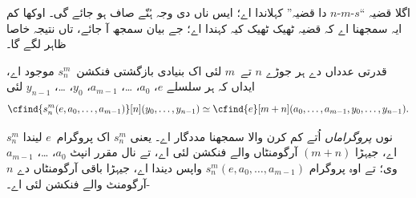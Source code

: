\documentclass[../../../include/open-logic-section]{subfiles}
\begin{document}

\begin{explain}
اگلا قضیہ ``$s$-$m$-$n$ دا قضیہ'' کہلاندا اے؛ ایس ناں دی
وجہ ہُنّے صاف ہو جائے گی۔ اوکھا کم ایہ سمجھنا اے کہ
قضیہ ٹھیک ٹھیک کیہ کہندا اے؛ جے بیان سمجھ آ جائے، تاں
نتیجہ خاصا ظاہر لگے گا۔
\end{explain}

\begin{thm}
  قدرتی عدداں دے ہر جوڑے $n$ تے~$m$ لئی اک بنیادی
  بازگشتی فنکشن~$s^m_n$ موجود اے، ایداں کہ ہر سلسلے
  $e$، $a_0$، \dots، $a_{m-1}$، $y_0$، \dots، $y_{n-1}$ لئی
  \[
  \cfind{s^m_n(e, a_0, \dots, a_{m-1})}[n](y_0, \dots, y_{n-1}) \simeq
  \cfind{e}[m+n](a_0, \dots, a_{m-1}, y_0, \dots, y_{n-1}).
\]
\end{thm}

\begin{explain}
$s^m_n$ نوں \emph{پروگراماں} اُتے کم کرن والا سمجھنا مددگار
اے۔ یعنی $s^m_n$ اک پروگرام~$e$ لیندا اے، جیہڑا $(m+n)$
آرگومنٹاں والے فنکشن لئی اے، تے نال مقرر انپٹ $a_0$،
\dots، $a_{m-1}$ وی؛ تے اوہ پروگرام
$s^m_n(e, a_0, \dots, a_{m-1})$ واپس دیندا اے، جیہڑا باقی
آرگومنٹاں دے $n$-آرگومنٹ والے فنکشن لئی اے۔ 
\end{explain}
\end{document}
